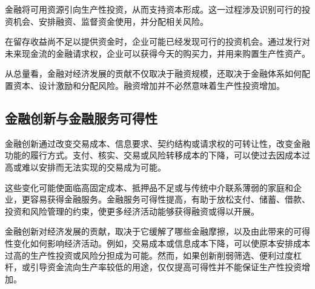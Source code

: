 金融将可用资源引向生产性投资，从而支持资本形成。这一过程涉及识别可行的投资机会、安排融资、监督资金使用，并分配相关风险。

在留存收益尚不足以提供资金时，企业可能已经发现可行的投资机会。通过发行对未来现金流的金融请求权，企业可以获得今天的购买力，并用来购置生产性资产。

从总量看，金融对经济发展的贡献不仅取决于融资规模，还取决于金融体系如何配置资本、设计激励和分配风险。融资增加并不必然意味着生产性投资增加。

\subsection{金融创新与金融服务可得性}

金融创新通过改变交易成本、信息要求、契约结构或请求权的可转让性，改变金融功能的履行方式。支付、核实、交易或风险转移成本的下降，可以使过去因成本过高或难以安排而无法实现的交易成为可能。

这些变化可能使面临高固定成本、抵押品不足或与传统中介联系薄弱的家庭和企业，更容易获得金融服务。金融服务可得性提高，有助于放松支付、储蓄、借款、投资和风险管理的约束，使更多经济活动能够获得融资或得以开展。

金融创新对经济发展的贡献，取决于它缓解了哪些金融摩擦，以及由此带来的可得性变化如何影响经济活动。例如，交易成本或信息成本下降，可以使原本安排成本过高的生产性投资或风险分担成为可能。然而，如果创新削弱筛选、便利过度杠杆，或引导资金流向生产率较低的用途，仅仅提高可得性并不能保证生产性投资增加。



